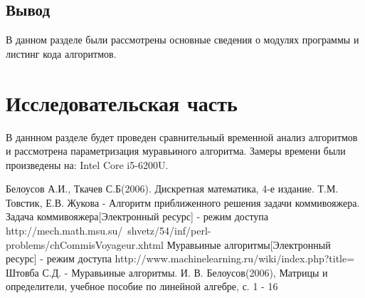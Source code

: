\documentclass[12pt]{report}
\begin{document}
\section*{Вывод}
В данном разделе были рассмотрены основные сведения о модулях программы и листинг кода алгоритмов.

\chapter{Исследовательская часть}
В даннном разделе будет проведен сравнительный временной анализ алгоритмов и рассмотрена параметризация муравьиного алгоритма. Замеры времени были произведены на: Intel Core i5-6200U.


\begin{thebibliography}{3}
	 Белоусов А.И., Ткачев С.Б(2006). Дискретная математика, 4-е издание.
	 Т.М. Товстик, Е.В. Жукова - Алгоритм приближенного решения задачи коммивояжера.
	 Задача коммивояжера[Электронный ресурс] - режим доступа http://mech.math.msu.su/~shvetz/54/inf/perl-problems/chCommisVoyageur.xhtml
	 Муравьиные алгоритмы[Электронный ресурс] - режим доступа http://www.machinelearning.ru/wiki/index.php?title=%
	 Штовба С.Д. - Муравьиные алгоритмы.
	 И. В. Белоусов(2006), Матрицы и определители, учебное пособие по линейной алгебре, с. 1 - 16
\end{thebibliography}
\end{document}
